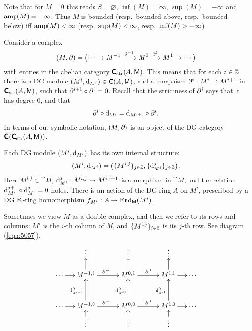 Note that for $M = 0$ this reads $S = \varnothing$, 
$\inf (M) = \infty$, $\sup (M) = -\infty$ 
and $\operatorname{amp} (M) = -\infty$.
Thus $M$ is bounded (resp.\ bounded above, resp.\ bounded below) iff 
$\operatorname{amp} (M) < \infty$ (resp.\ $\operatorname{sup} (M) < \infty$, resp.\
$\operatorname{inf} (M) > -\infty$).



Consider a complex 
\begin{equation} \label{eqn:3300}
(M, \partial) = \bigl( \cdots \to M^{-1} \xrightarrow{\partial^{-1}}
M^{0} \xrightarrow{\partial^{0}} M^{1} \to \cdots \bigr) 
\end{equation}
with entries in the abelian category $\boldsymbol{\mathsf{C}}_{\mathrm{str}}(A, \operatorname{\mathsf{M}})$. 
This means that for each $i \in \mathbb{Z}$ there is a DG module 
$(M^{i}, \mathrm{d}_{M^i}) \in \boldsymbol{\mathsf{C}}(A, \operatorname{\mathsf{M}})$, 
and a morphism 
$\partial^i : M^i \to M^{i + 1}$
in $\boldsymbol{\mathsf{C}}_{\mathrm{str}}(A, \operatorname{\mathsf{M}})$, 
such that $\partial^{i + 1} \circ \partial^i = 0$.
Recall that the strictness of $\partial^i$ says that it has degree $0$, and that
\begin{equation} \label{eqn:3365}
\partial^i \circ \mathrm{d}_{M^i}  = \mathrm{d}_{M^{i + 1}} \circ \partial^i .
\end{equation}
In terms of our symbolic notation, $(M, \partial)$ is an object of the DG category 
\lb $\boldsymbol{\mathsf{C}}(\boldsymbol{\mathsf{C}}_{\mathrm{str}}(A, \operatorname{\mathsf{M}}))$. 

Each DG module $(M^i, \mathrm{d}_{M^i})$ has its own internal structure:
\begin{equation} \label{eqn:3305}
(M^i, \mathrm{d}_{M^i}) = \bigl( \{ M^{i, j} \}_{j \in \mathbb{Z}}, 
\{ \mathrm{d}_{M^{i}}^{ j} \}_{j \in \mathbb{Z}} \bigr) . 
\end{equation}
Here $M^{i, j} \in \cat{M}$, 
$\mathrm{d}_{M^{i}}^{ j} : M^{i, j} \to M^{i, j + 1}$ 
is a morphism in $\cat{M}$, and the relation 
$\mathrm{d}_{M^{i}}^{ j + 1} \circ \mathrm{d}_{M^{i}}^{ j} = 0$ holds.
There is an action of the DG ring $A$ on $M^i$, prescribed by a DG $\mathbb{K}$-ring 
homomorphism 
$f_{M^i} : A \to \operatorname{End}_{\operatorname{\mathsf{M}}}(M^i)$.

Sometimes we view $M$ as a double complex, and then we refer to its rows and 
columns: $M^i$ is the $i$-th column of $M$, and
$\{ M^{i, j} \}_{i \in \mathbb{Z}}$ is its $j$-th row.
See diagram (\ref{eqn:5057}). 
\begin{equation} \label{eqn:5057}
\UseTips \xymatrix @C=3ex @R=3ex {
&
\vdots
& &
\vdots
& &
\vdots
\\
\cdots
\ar[r]
& 
M^{-1, 1}
\ar[rr]^{\pa^{-1}}
\ar[u]
& &
M^{0, 1}
\ar[rr]^{\pa^{0}}
\ar[u]
& &
M^{1, 1}
\ar[r]
\ar[u]
& 
\cdots
\\ \\
\cdots
\ar[r]
& 
M^{-1, 0}
\ar[rr]^{\pa^{-1}}
\ar[uu]^{\d_{M^{-1}}^{0}}
& &
M^{0, 0}
\ar[rr]^{\pa^{0}}
\ar[uu]^{\d_{M^{0}}^{0}}
& &
M^{1, 0}
\ar[r]
\ar[uu]^{\d_{M^{1}}^{0}}
& 
\cdots
\\
&
*[u]{\vdots}
\ar[u]
& &
*[u]{\vdots}
\ar[u]
& &
*[u]{\vdots}
\ar[u]
} 
\end{equation}


